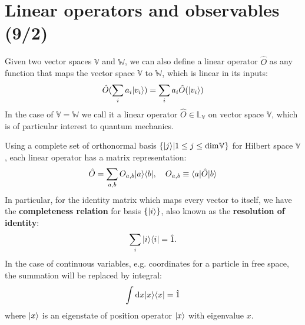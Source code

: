 \section{Linear operators and observables (9/2)}


Given two vector spaces $\mathbb{V}$ and $\mathbb{W}$, we can also define a linear operator $\hat O$ as any function that maps the vector space $\mathbb{V}$ to $\mathbb{W}$, which is linear in its inputs:
\begin{align}
\hat O(\sum_ia_i|{v_i}\rangle)=\sum_ia_i\hat O(|{v_i}\rangle)
\end{align}
In the case of $\mathbb{V}=\mathbb{W}$ we call it a linear operator $\hat O\in\mathbb{L}_\mathbb{V}$ on vector space $\mathbb{V}$, which is of particular interest to quantum mechanics.

Using a complete set of orthonormal basis $\{|{j}\rangle|1\leq j\leq\text{dim}\mathbb{V}\}$ for Hilbert space $\mathbb{V}$, each linear operator has a matrix representation:
\begin{align}
\hat O=\sum_{a,b}O_{a,b}|{a}\rangle\langle{b}|,~~~O_{a,b}\equiv\langle{a|\hat O|b}\rangle
\end{align}
In particular, for the identity matrix which maps every vector to itself, we have the \textbf{completeness relation} for basis $\{|{i}\rangle\}$, also known as the \textbf{resolution of identity}:
\begin{align}
\sum_i|{i}\rangle\langle{i}|=\hat 1.
\end{align}
In the case of continuous variables, e.g. coordinates for a particle in free space, the summation will be replaced by integral:
\begin{align}
    \int\mathrm{d} x|{x}\rangle\langle{x}|=\hat1
\end{align}
where $|{x}\rangle$ is an eigenstate of position operator $|{x}\rangle$ with eigenvalue $x$. 

